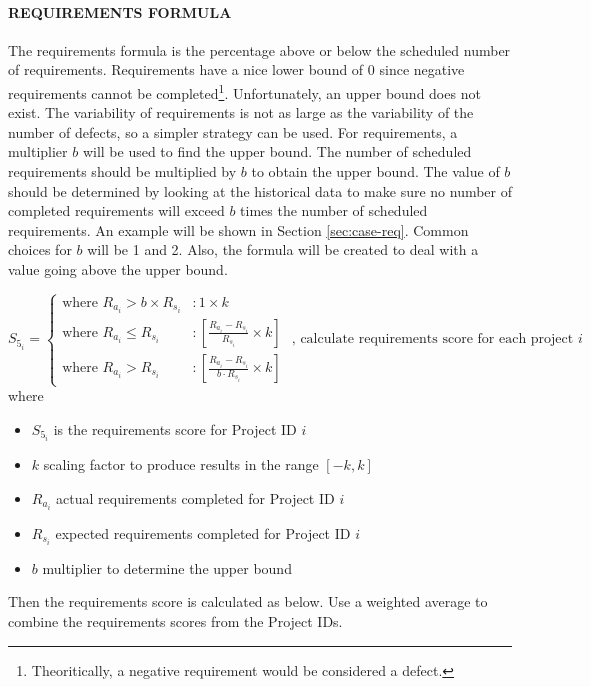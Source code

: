 \documentclass[SDSUThesis.tex]{subfiles}
\begin{document}
            \paragraph{REQUIREMENTS FORMULA}
                The requirements formula is the percentage above or below the
                scheduled number of requirements. Requirements have a nice
                lower bound of 0 since negative requirements cannot be 
                completed\footnote{Theoritically, a negative requirement would
                be considered a defect.}.  Unfortunately, an upper bound
                does not exist.  The variability of requirements is not
                as large as the variability of the number of defects, so
                a simpler strategy can be used.  For requirements, a 
                multiplier $b$ will be used to find the upper bound. The
                number of scheduled requirements should be multiplied by
                $b$ to obtain the upper bound.  The value of $b$ should
                be determined by looking at the historical data to make sure
                no number of completed requirements will exceed $b$ times
                the number of scheduled requirements. An example will be shown
                in Section \ref{sec:case-req}. Common choices for $b$ will be 1
                and 2. Also, the formula will be
                created to deal with a value going above the upper bound.
                
                \begin{displaymath}
                   S_{5_i} = \left\{
                     \begin{array}{lr}
                       \text{where } R_{a_i} > b \times R_{s_i} & :  1 \times k \\
                       \text{where } R_{a_i} \leq R_{s_i} & : \left[ \frac{R_{a_i} - R_{s_i}}{R_{s_i}}\times k \right] \\
                       \text{where } R_{a_i} > R_{s_i}  & : \left[ \frac{R_{a_i} - R_{s_i} }{b \cdot R_{s_i}}\times k \right]
                     \end{array}
                   \right. \text{   , calculate requirements score for each project $i$}
                \end{displaymath}
                where
                \begin{itemize}
                    \item $S_{5_i}$ is the requirements score for Project ID $i$
                    \item $k$ scaling factor to produce results in the range $[-k,k]$
                    \item $R_{a_i}$ actual requirements completed for Project ID $i$
                    \item $R_{s_i}$ expected requirements completed for Project ID $i$
                    \item $b$ multiplier to determine the upper bound
                \end{itemize}
                Then the requirements score is calculated as below.  
                Use a weighted average to combine the requirements scores
                from the Project IDs.
                
\end{document}
